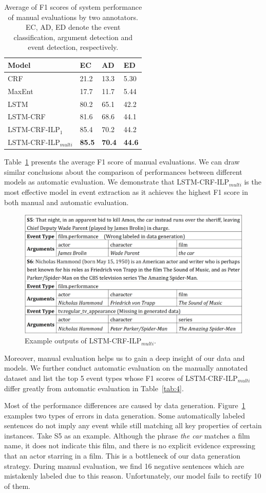 \begin{table}[h]
\small
\centering
\begin{tabular}{|l|p{0.8cm}<{\centering}|p{0.8cm}<{\centering}|p{0.8cm}<{\centering}|} \hline
	Model & EC & AD & ED \\ \hline
	CRF & 21.2 & 13.3 & 5.30 \\ \hline
	MaxEnt & 17.7 & 11.7 & 5.44 \\ \hline
	LSTM & 80.2 & 65.1 & 42.2 \\ \hline \hline
	LSTM-CRF & 81.6 & 68.6 & 44.1 \\ \hline
	LSTM-CRF-ILP$_{1}$ & 85.4 & 70.2 & 44.2 \\ \hline
	LSTM-CRF-ILP$_{multi}$ & \textbf{85.5} & \textbf{70.4} & \textbf{44.6} \\ \hline
\end{tabular}
\caption{Average of F1 scores of system performance of manual evaluations by two annotators. EC, AD, ED denote the event classification, argument detection and event detection, respectively. \label{tab:2}}
\end{table}

Table~\ref{tab:2} presents the average F1 score of manual evaluations. We can draw similar conclusions about the comparison of performances between different models as automatic evaluation. We demonstrate that LSTM-CRF-ILP$_{multi}$ is the most effective model in event extraction as it achieves the highest F1 score in both manual and automatic evaluation.

\begin{figure}[h]
	\centering
	\includegraphics[width=.49\textwidth]{temp_figure3.png}
	\caption{Example outputs of LSTM-CRF-ILP$_{multi}$.\label{fig:1}}
\end{figure}

Moreover, manual evaluation helps us to gain a deep insight of our data and models. We further conduct automatic evaluation on the manually annotated dataset and list the top 5 event types whose F1 scores of LSTM-CRF-ILP$_{multi}$ differ greatly from automatic evaluation in Table~\ref{tab:4}.

Most of the performance differences are caused by data generation. Figure~\ref{fig:1} examples two types of errors in data generation. Some automatically labeled sentences do not imply any event while still matching all key properties of certain instances. Take S5 as an example. Although the phrase \emph{the car} matches a film name, it does not indicate this film, and there is no explicit evidence expressing that an actor starring in a film. This is a bottleneck of our data generation strategy. During manual evaluation, we find 16 negative sentences which are mistakenly labeled due to this reason. Unfortunately, our model fails to rectify 10 of them.

